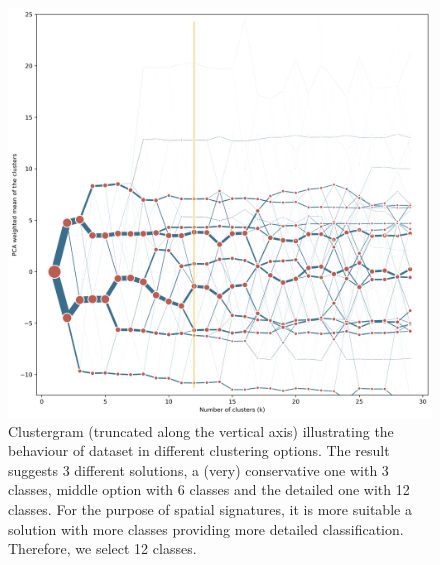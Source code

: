 \begin{figure}
    \includegraphics[width=\linewidth]{figures/clustergram_sin.png}
    \caption{Clustergram (truncated along the vertical axis) illustrating the behaviour
    of dataset in different clustering options. The result suggests 3 different
    solutions, a (very) conservative one with 3 classes, middle option with 6 classes
    and the detailed one with 12 classes. For the purpose of spatial signatures, it is
    more suitable a solution with more classes providing more detailed classification.
    Therefore, we select 12 classes.}
    \label{fig:cgram_sin}
\end{figure}
